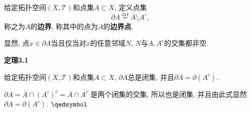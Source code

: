 给定拓扑空间$(X,\mathcal{T})$和点集$A\subset X$, 定义点集
\[
    \partial A\overset{\mathrm{def}}{=}\overline{A}\setminus A^\circ,
\]
称之为$A$的\textbf{边界}, 称其中的点为$A$的\textbf{边界点}.

显然, 点$x\in\partial A$当且仅当对$x$的任意邻域$N$, $N$与$A,A^c$的交集都非空.

\vspace{10pt}

\hypertarget{sec:定理3.1}{}
\noindent\textbf{定理3.1}

给定拓扑空间$(X,\mathcal{T})$和点集$A\subset X$, $\partial A$总是闭集,
并且$\partial A=\partial(A^c)$.


$\partial A=\overline{A}\cap(A^\circ)^c=\overline{A}\cap\overline{A^c}$
是两个闭集的交集, 所以也是闭集. 并且由此式显然$\partial A=\partial(A^c)$.
\hfill $\qedsymbol$

